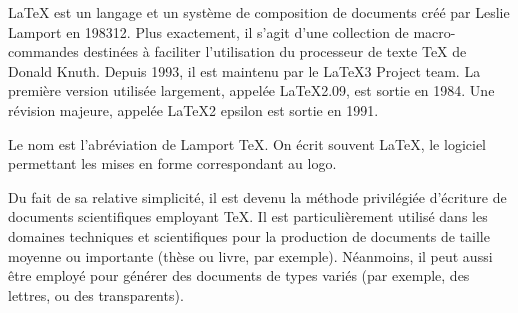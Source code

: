 \label{p2}


LaTeX est un langage et un système de composition de documents créé par Leslie Lamport en 198312. Plus exactement, il s'agit d'une collection de macro-commandes destinées à faciliter l'utilisation du \og processeur de texte \fg{} TeX de Donald Knuth. Depuis 1993, il est maintenu par le LaTeX3 Project team. La première version utilisée largement, appelée LaTeX2.09, est sortie en 1984. Une révision majeure, appelée LaTeX2 epsilon est sortie en 1991.

Le nom est l'abréviation de Lamport TeX. On écrit souvent \LaTeX, le logiciel permettant les mises en forme correspondant au logo.

Du fait de sa relative simplicité, il est devenu la méthode privilégiée d'écriture de documents scientifiques employant TeX. Il est particulièrement utilisé dans les domaines techniques et scientifiques pour la production de documents de taille moyenne ou importante (thèse ou livre, par exemple). Néanmoins, il peut aussi être employé pour générer des documents de types variés (par exemple, des lettres, ou des transparents).

